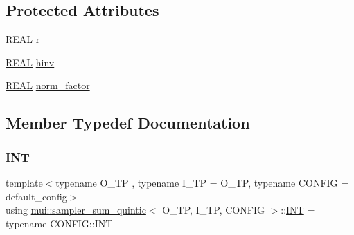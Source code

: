 \subsection*{Protected Attributes}
\begin{DoxyCompactItemize}
\item 
\hyperlink{classmui_1_1sampler__sum__quintic_a9cbbc0e8f2384abe39ec2339229b64b6}{R\+E\+AL} \hyperlink{classmui_1_1sampler__sum__quintic_a6e3b95f28e5e487bfac148b6b3ba8c4e}{r}
\item 
\hyperlink{classmui_1_1sampler__sum__quintic_a9cbbc0e8f2384abe39ec2339229b64b6}{R\+E\+AL} \hyperlink{classmui_1_1sampler__sum__quintic_ad45d288f6a27a7fea8bb281170c8872e}{hinv}
\item 
\hyperlink{classmui_1_1sampler__sum__quintic_a9cbbc0e8f2384abe39ec2339229b64b6}{R\+E\+AL} \hyperlink{classmui_1_1sampler__sum__quintic_ae9fc2f2df8585bd5a32162d39fe4687f}{norm\+\_\+factor}
\end{DoxyCompactItemize}


\subsection{Member Typedef Documentation}
\mbox{\label{classmui_1_1sampler__sum__quintic_a64a01190b668aa6a66149c1f74da1e34}} 
\subsubsection{\texorpdfstring{I\+NT}{INT}}
{\footnotesize\ttfamily template$<$typename O\+\_\+\+TP , typename I\+\_\+\+TP  = O\+\_\+\+TP, typename C\+O\+N\+F\+IG  = default\+\_\+config$>$ \\
using \hyperlink{classmui_1_1sampler__sum__quintic}{mui\+::sampler\+\_\+sum\+\_\+quintic}$<$ O\+\_\+\+TP, I\+\_\+\+TP, C\+O\+N\+F\+IG $>$\+::\hyperlink{classmui_1_1sampler__sum__quintic_a64a01190b668aa6a66149c1f74da1e34}{I\+NT} =  typename C\+O\+N\+F\+I\+G\+::\+I\+NT}

\mbox{\label{classmui_1_1sampler__sum__quintic_aefb0c5d19f1e834ee9d4c41efe31d222}} 
